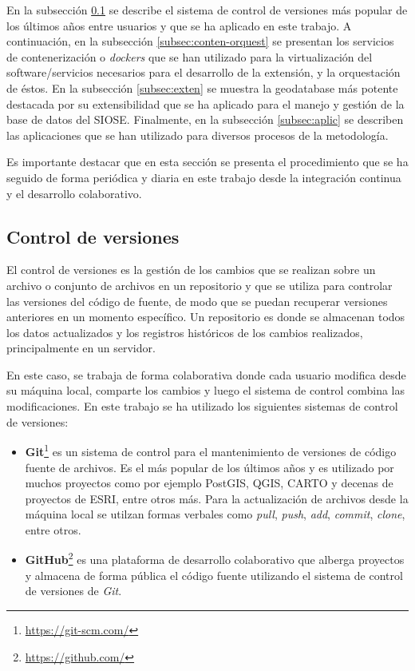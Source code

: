 En la subsección \ref{subsec:control} se describe el sistema de control de versiones más popular de los últimos años entre usuarios y que se ha aplicado en este trabajo. A continuación, en la subsección \ref{subsec:conten-orquest} se presentan los servicios de contenerización o \textit{dockers} que se han utilizado para la virtualización del software/servicios necesarios para el desarrollo de la extensión, y la orquestación de éstos. En la subsección \ref{subsec:exten} se muestra la geodatabase más potente destacada por su extensibilidad que se ha aplicado para el manejo y gestión de la base de datos del SIOSE. Finalmente, en la subsección \ref{subsec:aplic} se describen las aplicaciones que se han utilizado para diversos procesos de la metodología.

Es importante destacar que en esta sección se presenta el procedimiento que se ha seguido de forma periódica y diaria en este trabajo desde la integración continua y el desarrollo colaborativo.


\subsection{Control de versiones}\label{subsec:control}

El control de versiones es la gestión de los cambios que se realizan sobre un archivo o conjunto de archivos en un repositorio y que se utiliza para controlar las versiones del código de fuente, de modo que se puedan recuperar versiones anteriores en un momento específico. Un repositorio es donde se almacenan todos los datos actualizados y los registros históricos de los cambios realizados, principalmente en un servidor.

En este caso, se trabaja de forma colaborativa donde cada usuario modifica desde su máquina local, comparte los cambios y luego el sistema de control combina las modificaciones. En este trabajo se ha utilizado los siguientes sistemas de control de versiones:

\begin{itemize}
\item\textbf{Git}\footnote{\url{https://git-scm.com/}} es un sistema de control para el mantenimiento de versiones de código fuente de archivos. Es el más popular de los últimos años y es utilizado por muchos proyectos como por ejemplo PostGIS, QGIS, CARTO y decenas de proyectos de ESRI, entre otros más. Para la actualización de archivos desde la máquina local se utilzan formas verbales como \textit{pull}, \textit{push}, \textit{add}, \textit{commit}, \textit{clone}, entre otros.
\item\textbf{GitHub}\footnote{\url{https://github.com/}} es una plataforma de desarrollo colaborativo que alberga proyectos y almacena de forma pública el código fuente utilizando el sistema de control de versiones de \textit{Git}.
\end{itemize}

